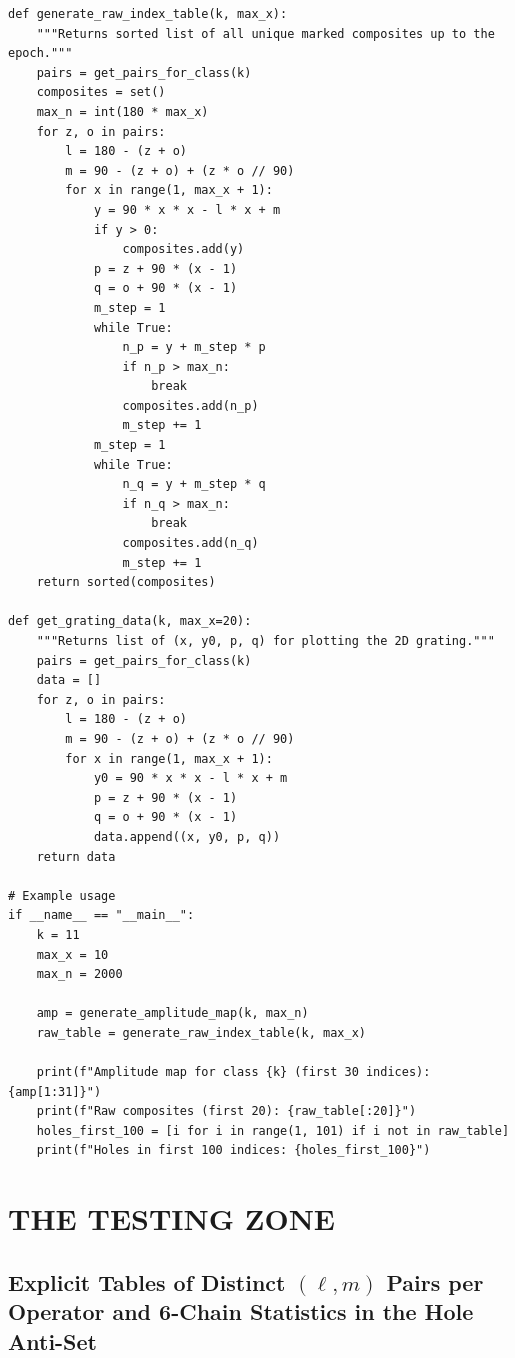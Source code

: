 \documentclass[11pt,a4paper]{article}
\begin{document}
\begin{verbatim}
def generate_raw_index_table(k, max_x):
    """Returns sorted list of all unique marked composites up to the epoch."""
    pairs = get_pairs_for_class(k)
    composites = set()
    max_n = int(180 * max_x)
    for z, o in pairs:
        l = 180 - (z + o)
        m = 90 - (z + o) + (z * o // 90)
        for x in range(1, max_x + 1):
            y = 90 * x * x - l * x + m
            if y > 0:
                composites.add(y)
            p = z + 90 * (x - 1)
            q = o + 90 * (x - 1)
            m_step = 1
            while True:
                n_p = y + m_step * p
                if n_p > max_n:
                    break
                composites.add(n_p)
                m_step += 1
            m_step = 1
            while True:
                n_q = y + m_step * q
                if n_q > max_n:
                    break
                composites.add(n_q)
                m_step += 1
    return sorted(composites)

def get_grating_data(k, max_x=20):
    """Returns list of (x, y0, p, q) for plotting the 2D grating."""
    pairs = get_pairs_for_class(k)
    data = []
    for z, o in pairs:
        l = 180 - (z + o)
        m = 90 - (z + o) + (z * o // 90)
        for x in range(1, max_x + 1):
            y0 = 90 * x * x - l * x + m
            p = z + 90 * (x - 1)
            q = o + 90 * (x - 1)
            data.append((x, y0, p, q))
    return data

# Example usage
if __name__ == "__main__":
    k = 11
    max_x = 10
    max_n = 2000

    amp = generate_amplitude_map(k, max_n)
    raw_table = generate_raw_index_table(k, max_x)

    print(f"Amplitude map for class {k} (first 30 indices): {amp[1:31]}")
    print(f"Raw composites (first 20): {raw_table[:20]}")
    holes_first_100 = [i for i in range(1, 101) if i not in raw_table]
    print(f"Holes in first 100 indices: {holes_first_100}")
\end{verbatim}


\section{THE TESTING ZONE}
\subsection{Explicit Tables of Distinct \((\ell, m)\) Pairs per Operator and 6-Chain Statistics in the Hole Anti-Set}
\end{document}
